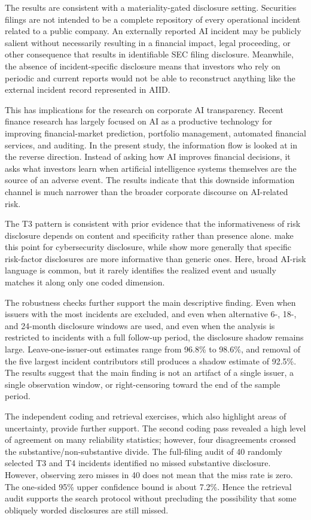 \documentclass[utf8]{FrontiersinHarvard}
\begin{document}
The results are consistent with a materiality-gated disclosure setting. Securities filings are not intended to be a complete repository of every operational incident related to a public company. An externally reported AI incident may be publicly salient without necessarily resulting in a financial impact, legal proceeding, or other consequence that results in identifiable SEC filing disclosure. Meanwhile, the absence of incident-specific disclosure means that investors who rely on periodic and current reports would not be able to reconstruct anything like the external incident record represented in AIID.

This has implications for the research on corporate AI transparency. Recent finance research has largely focused on AI as a productive technology for improving financial-market prediction, portfolio management, automated financial services, and auditing. In the present study, the information flow is looked at in the reverse direction. Instead of asking how AI improves financial decisions, it asks what investors learn when artificial intelligence systems themselves are the source of an adverse event. The results indicate that this downside information channel is much narrower than the broader corporate discourse on AI-related risk.

The T3 pattern is consistent with prior evidence that the informativeness of risk disclosure depends on content and specificity rather than presence alone. \citet{WangKannanUlmer2013} make this point for cybersecurity disclosure, while \citet{Hope2016} show more generally that specific risk-factor disclosures are more informative than generic ones. Here, broad AI-risk language is common, but it rarely identifies the realized event and usually matches it along only one coded dimension.

The robustness checks further support the main descriptive finding. Even when issuers with the most incidents are excluded, and even when alternative 6-, 18-, and 24-month disclosure windows are used, and even when the analysis is restricted to incidents with a full follow-up period, the disclosure shadow remains large. Leave-one-issuer-out estimates range from 96.8\% to 98.6\%, and removal of the five largest incident contributors still produces a shadow estimate of 92.5\%. The results suggest that the main finding is not an artifact of a single issuer, a single observation window, or right-censoring toward the end of the sample period.

The independent coding and retrieval exercises, which also highlight areas of uncertainty, provide further support. The second coding pass revealed a high level of agreement on many reliability statistics; however, four disagreements crossed the substantive/non-substantive divide. The full-filing audit of 40 randomly selected T3 and T4 incidents identified no missed substantive disclosure. However, observing zero misses in 40 does not mean that the miss rate is zero. The one-sided 95\% upper confidence bound is about 7.2\%. Hence the retrieval audit supports the search protocol without precluding the possibility that some obliquely worded disclosures are still missed.
\end{document}
